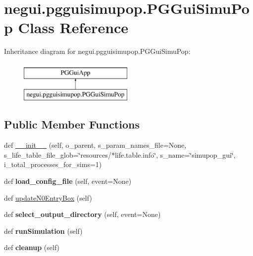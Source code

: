 \hypertarget{classnegui_1_1pgguisimupop_1_1PGGuiSimuPop}{}\section{negui.\+pgguisimupop.\+P\+G\+Gui\+Simu\+Pop Class Reference}
\label{classnegui_1_1pgguisimupop_1_1PGGuiSimuPop}
Inheritance diagram for negui.\+pgguisimupop.\+P\+G\+Gui\+Simu\+Pop\+:\begin{figure}[H]
\begin{center}
\leavevmode
\includegraphics[height=2.000000cm]{classnegui_1_1pgguisimupop_1_1PGGuiSimuPop}
\end{center}
\end{figure}
\subsection*{Public Member Functions}
\begin{DoxyCompactItemize}
\item 
def \hyperlink{classnegui_1_1pgguisimupop_1_1PGGuiSimuPop_aa159ead5d8fbd28d693c9021db12b95e}{\+\_\+\+\_\+init\+\_\+\+\_\+} (self, o\+\_\+parent, s\+\_\+param\+\_\+names\+\_\+file=None, s\+\_\+life\+\_\+table\+\_\+file\+\_\+glob=\char`\"{}resources/$\ast$life.\+table.\+info\char`\"{}, s\+\_\+name=\char`\"{}simupop\+\_\+gui\char`\"{}, i\+\_\+total\+\_\+processes\+\_\+for\+\_\+sims=1)
\item 
def {\bfseries load\+\_\+config\+\_\+file} (self, event=None)\hypertarget{classnegui_1_1pgguisimupop_1_1PGGuiSimuPop_a9ae755614518ece6584d83aff129f4d5}{}\label{classnegui_1_1pgguisimupop_1_1PGGuiSimuPop_a9ae755614518ece6584d83aff129f4d5}

\item 
def \hyperlink{classnegui_1_1pgguisimupop_1_1PGGuiSimuPop_ac193cf44f5e4f1e5b146a43e9563d7b0}{update\+N0\+Entry\+Box} (self)
\item 
def {\bfseries select\+\_\+output\+\_\+directory} (self, event=None)\hypertarget{classnegui_1_1pgguisimupop_1_1PGGuiSimuPop_a4d88e502ff12249698177dbb4336715d}{}\label{classnegui_1_1pgguisimupop_1_1PGGuiSimuPop_a4d88e502ff12249698177dbb4336715d}

\item 
def {\bfseries run\+Simulation} (self)\hypertarget{classnegui_1_1pgguisimupop_1_1PGGuiSimuPop_a7dc99019295f2a2650fa95ecddd55239}{}\label{classnegui_1_1pgguisimupop_1_1PGGuiSimuPop_a7dc99019295f2a2650fa95ecddd55239}

\item 
def {\bfseries cleanup} (self)\hypertarget{classnegui_1_1pgguisimupop_1_1PGGuiSimuPop_a24642a8bffa19a61a4fb1b6d5e9f0a1c}{}\label{classnegui_1_1pgguisimupop_1_1PGGuiSimuPop_a24642a8bffa19a61a4fb1b6d5e9f0a1c}

\end{DoxyCompactItemize}
